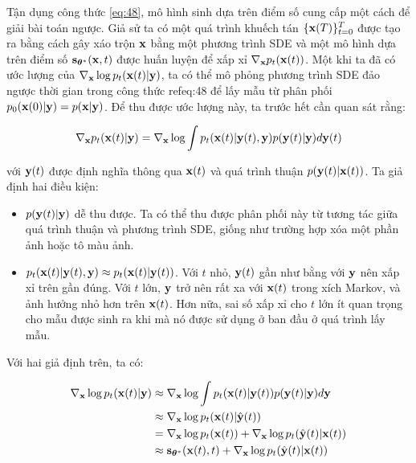 \documentclass{article} %
\begin{document}
Tận dụng công thức \ref{eq:48}, mô hình sinh dựa trên điểm số cung cấp một cách để giải bài toán ngược.
Giả sử ta có một quá trình khuếch tán $\lbrace \bold{x}(T) \rbrace_{t=0}^T$ được tạo ra bằng cách gây xáo trộn $\bold{x}$ bằng một phương trình SDE và một mô hình dựa trên điểm số $\bold{s}_{\boldsymbol{\theta}^{\ast}}(\bold{x}, t)$ được huấn luyện để xấp xỉ $\nabla_{\bold{x}} p_t(\bold{x}(t))$.
Một khi ta đã có ước lượng của $\nabla_{\bold{x}} \log p_t(\bold{x}(t) \vert \bold{y})$, ta có thể mô phỏng phương trình SDE đảo ngược thời gian trong công thức ref{eq:48} để lấy mẫu từ phân phối $p_0(\bold{x}(0) \vert \bold{y})=p(\bold{x} \vert \bold{y})$.
Để thu được ước lượng này, ta trước hết cần quan sát rằng:

\begin{equation*}
    \nabla_{\bold{x}} p_t (\bold{x}(t) \vert \bold{y}) = \nabla_{\bold{x}} \log \int p_t(\bold{x}(t) \vert \bold{y}(t), \bold{y}) p(\bold{y}(t) \vert \bold{y}) d \bold{y}(t)
\end{equation*}

với $\bold{y}(t)$ được định nghĩa thông qua $\bold{x}(t)$ và quá trình thuận $p(\bold{y}(t) \vert \bold{x}(t))$. Ta giả định hai điều kiện:

\begin{itemize}
    \item $p(\bold{y}(t) \vert \bold{y})$ dễ thu được.
    Ta có thể thu được phân phối này từ tương tác giữa quá trình thuận  và phương trình SDE, giống như trường hợp xóa một phần ảnh hoặc tô màu ảnh.
    \item $p_t(\bold{x}(t) \vert \bold{y}(t), \bold{y}) \approx p_t(\bold{x}(t) \vert \bold{y}(t))$.
    Với $t$ nhỏ, $\bold{y}(t)$ gần như bằng với $\bold{y}$ nên xấp xỉ trên gần đúng.
    Với $t$ lớn, $\bold{y}$ trở nên rất xa với $\bold{x}(t)$ trong xích Markov,
    và ảnh hưởng nhỏ hơn trên $\bold{x}(t)$.
    Hơn nữa, sai số xấp xỉ cho $t$ lớn ít quan trọng cho mẫu được sinh ra khi mà nó được sử dụng ở ban đầu ở quá trình lấy mẫu.
\end{itemize}

Với hai giả định trên, ta có:

\begin{equation} \label{eq:50}
    \begin{aligned}
        \nabla_{\bold{x}} \log p_t (\bold{x}(t) \vert \bold{y}) &\approx \nabla_{\bold{x}} \log \int p_t(\bold{x}(t) \vert \bold{y}(t)) p(\bold{y}(t) \vert \bold{y}) d\bold{y} \\
        &\approx \nabla_{\bold{x}} \log p_t(\bold{x}(t) \vert \hat{\bold{y}}(t)) \\
        &= \nabla_{\bold{x}} \log p_t(\bold{x}(t)) + \nabla_{\bold{x}} \log p_t (\hat{\bold{y}}(t) \vert \bold{x}(t)) \\
        &\approx \bold{s}_{\boldsymbol{\theta}^{\ast}} (\bold{x}(t), t) + \nabla_{\bold{x}} \log p_t (\hat{\bold{y}}(t) \vert \bold{x}(t))
    \end{aligned}
\end{equation}
\end{document}
